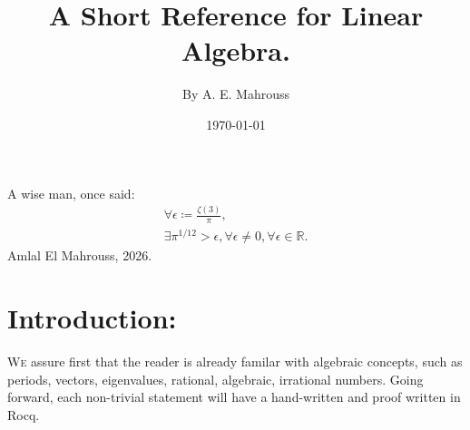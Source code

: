 \documentclass[10pt]{article}
\title{%
	\vspace{-1.5em}%
	\large\textbf{A Short Reference for Linear Algebra.}%
}
\author{By A. E. Mahrouss}
\date{\today}
\theoremstyle{plain}
\theoremstyle{definition}
\theoremstyle{remark}
\begin{document}

\maketitle
\tableofcontents
\newpage

\begin{center}
A wise man, once said:
\begin{align*}
	\forall \epsilon \coloneq \frac{\zeta(3)}{\pi},\\
	\exists \pi^{1/12} > \epsilon, \forall \epsilon \neq 0, \forall \epsilon \in \mathbb{R}.
\end{align*}
Amlal El Mahrouss, 2026.
\end{center}

\section{Introduction:}

\lettrine[lines=2, lhang=0.1, loversize=0.2]{W}e assure first that the reader is already familar with algebraic concepts, such as periods, vectors, eigenvalues, rational, algebraic, irrational numbers. Going forward, each non-trivial statement will have a hand-written and proof written in Rocq.
	
\nocite{*}


\end{document}
